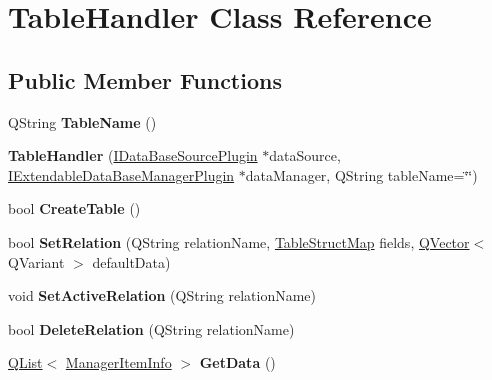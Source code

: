 \hypertarget{class_table_handler}{}\section{Table\+Handler Class Reference}
\label{class_table_handler}
\subsection*{Public Member Functions}
\begin{DoxyCompactItemize}
\item 
\mbox{\label{class_table_handler_a20dc6faa1425f198209d56bb535b1a72}} 
Q\+String {\bfseries Table\+Name} ()
\item 
\mbox{\label{class_table_handler_a74f015a8365c93a78de54748b9ad38d3}} 
{\bfseries Table\+Handler} (\hyperlink{class_i_data_base_source_plugin}{I\+Data\+Base\+Source\+Plugin} $\ast$data\+Source, \hyperlink{class_i_extendable_data_base_manager_plugin}{I\+Extendable\+Data\+Base\+Manager\+Plugin} $\ast$data\+Manager, Q\+String table\+Name=\char`\"{}\char`\"{})
\item 
\mbox{\label{class_table_handler_abea316ba4ae1d601fd2b36684c5de86d}} 
bool {\bfseries Create\+Table} ()
\item 
\mbox{\label{class_table_handler_a420f94195257d620752b2099679f7c24}} 
bool {\bfseries Set\+Relation} (Q\+String relation\+Name, \hyperlink{class_q_map}{Table\+Struct\+Map} fields, \hyperlink{class_q_vector}{Q\+Vector}$<$ Q\+Variant $>$ default\+Data)
\item 
\mbox{\label{class_table_handler_a46215bc7cc52ed769968c6bd0ce38f10}} 
void {\bfseries Set\+Active\+Relation} (Q\+String relation\+Name)
\item 
\mbox{\label{class_table_handler_a656e0c98391e7fe201c523542adc50a2}} 
bool {\bfseries Delete\+Relation} (Q\+String relation\+Name)
\item 
\mbox{\label{class_table_handler_af0b4da1a3d599f33d0ad6fadc150e664}} 
\hyperlink{class_q_list}{Q\+List}$<$ \hyperlink{class_i_extendable_data_base_manager_plugin_1_1_manager_data_item}{Manager\+Item\+Info} $>$ {\bfseries Get\+Data} ()

\end{DoxyCompactItemize}
